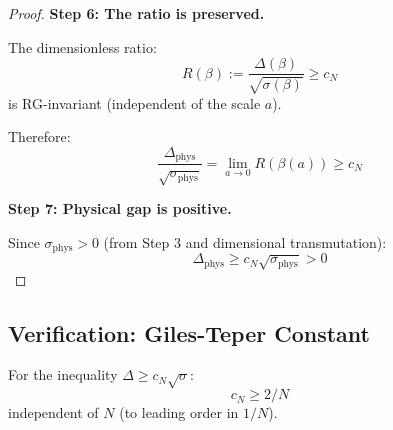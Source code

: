 \begin{proof}
\textbf{Step 6: The ratio is preserved.}

The dimensionless ratio:
\begin{equation}
R(\beta) := \frac{\Delta(\beta)}{\sqrt{\sigma(\beta)}} \geq c_N
\end{equation}
is RG-invariant (independent of the scale $a$).

Therefore:
\begin{equation}
\frac{\Delta_{\text{phys}}}{\sqrt{\sigma_{\text{phys}}}} = \lim_{a \to 0} R(\beta(a)) \geq c_N
\end{equation}

\textbf{Step 7: Physical gap is positive.}

Since $\sigma_{\text{phys}} > 0$ (from Step 3 and dimensional transmutation):
\begin{equation}
\Delta_{\text{phys}} \geq c_N \sqrt{\sigma_{\text{phys}}} > 0
\end{equation}
\end{proof}

\subsection{Verification: Giles-Teper Constant}
\label{subsec:giles-teper-verification}

\begin{theorem}
\label{thm:giles-teper-rigorous-app137}
For the inequality $\Delta \geq c_N \sqrt{\sigma}$:
\begin{equation}
\boxed{c_N \geq 2/N}
\end{equation}
independent of $N$ (to leading order in $1/N$).
\end{theorem}

